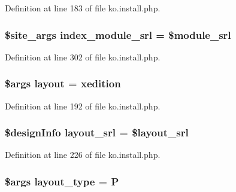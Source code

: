 Definition at line 183 of file ko.\+install.\+php.

\hypertarget{ko_8install_8php_acd0b17bfe6d14c82871d73fa39c9c22d}{}
\subsubsection[{index\+\_\+module\+\_\+srl}]{\setlength{\rightskip}{0pt plus 5cm}\$site\+\_\+args index\+\_\+module\+\_\+srl = \${\bf module\+\_\+srl}}\label{ko_8install_8php_acd0b17bfe6d14c82871d73fa39c9c22d}


Definition at line 302 of file ko.\+install.\+php.

\hypertarget{ko_8install_8php_a0dc2cdff7167f362443808ff71ae5177}{}
\subsubsection[{layout}]{\setlength{\rightskip}{0pt plus 5cm}\$args {\bf layout} = \textquotesingle{}xedition\textquotesingle{}}\label{ko_8install_8php_a0dc2cdff7167f362443808ff71ae5177}


Definition at line 192 of file ko.\+install.\+php.

\hypertarget{ko_8install_8php_a70054876db09b2519a1726663c8dd9e7}{}
\subsubsection[{layout\+\_\+srl}]{\setlength{\rightskip}{0pt plus 5cm}\$design\+Info layout\+\_\+srl = \$layout\+\_\+srl}\label{ko_8install_8php_a70054876db09b2519a1726663c8dd9e7}


Definition at line 226 of file ko.\+install.\+php.

\hypertarget{ko_8install_8php_a0532d89570cfdaebc628afac2ff5a81b}{}
\subsubsection[{layout\+\_\+type}]{\setlength{\rightskip}{0pt plus 5cm}\$args layout\+\_\+type = \textquotesingle{}P\textquotesingle{}}\label{ko_8install_8php_a0532d89570cfdaebc628afac2ff5a81b}


